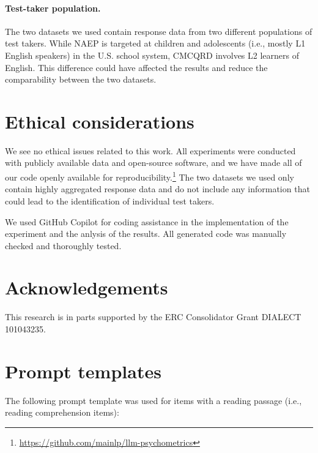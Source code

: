 \documentclass[11pt]{article}
\begin{document}
\paragraph{Test-taker population.}
The two datasets we used contain response data from two different populations of test takers. While NAEP is targeted at children and adolescents (i.e., mostly L1 English speakers) in the U.S. school system, CMCQRD involves L2 learners of English. This difference could have affected the results and reduce the comparability between the two datasets.

\section*{Ethical considerations}

We see no ethical issues related to this work. All experiments were conducted with publicly available data and open-source software, and we have made all of our code openly available for reproducibility.\footnote{\url{https://github.com/mainlp/llm-psychometrics}} The two datasets we used only contain highly aggregated response data and do not include any information that could lead to the identification of individual test takers.

We used GitHub Copilot for coding assistance in the implementation of the experiment and the anlysis of the results. All generated code was manually checked and thoroughly tested.

\section*{Acknowledgements}

This research is in parts supported by the ERC Consolidator Grant DIALECT 101043235.




\onecolumn
\appendix

\section{Prompt templates}
\label{sec:appendix-prompt}

The following prompt template was used for items with a reading passage (i.e., reading comprehension items):

\noindent{}
\end{document}
